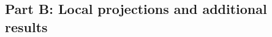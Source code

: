\documentclass[12pt, a4paper]{article}
\begin{document}



\pagebreak
\subsection*{Part B: Local projections and additional results} \label{appendix:b}
\renewcommand{\thetable}{B\arabic{table}}
\setcounter{table}{0}
\end{document}
